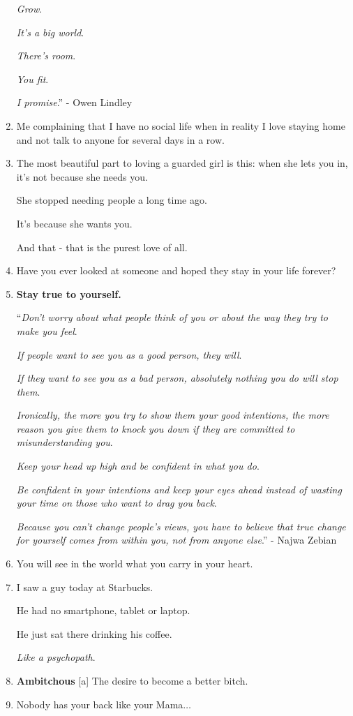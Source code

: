 \documentclass{article}
\begin{document}
\begin{enumerate}
	\textit{Grow}.
	
	\textit{It's a big world}.
	
	\textit{There's room}.
	
	\textit{You fit}.
	
	\textit{I promise}.'' - Owen Lindley
	\item Me complaining that I have no social life when in reality I love staying home and not talk to anyone for several days in a row.
	\item The most beautiful part to loving a guarded girl is this: when she lets you in, it's not because she needs you.
	
	She stopped needing people a long time ago.
	
	It's because she wants you.
	
	And that - that is the purest love of all.
	\item Have you ever looked at someone and hoped they stay in your life forever?
	\item \textbf{Stay true to yourself.}
	
	``\textit{Don't worry about what people think of you or about the way they try to make you feel}.
	
	\textit{If people want to see you as a good person, they will}.
	
	\textit{If they want to see you as a bad person, absolutely nothing you do will stop them}.
	
	\textit{Ironically, the more you try to show them your good intentions, the more reason you give them to knock you down if they are committed to misunderstanding you}.
	
	\textit{Keep your head up high and be confident in what you do}.
	
	\textit{Be confident in your intentions and keep your eyes ahead instead of wasting your time on those who want to drag you back}.
	
	\textit{Because you can't change people's views, you have to believe that true change for yourself comes from within you, not from anyone else}.'' - Najwa Zebian
	\item You will see in the world what you carry in your heart.
	\item I saw a guy today at Starbucks.
	
	He had no smartphone, tablet or laptop.
	
	He just sat there drinking his coffee.
	
	\textit{Like a psychopath}.
	\item \textbf{Ambitchous} [a] The desire to become a better bitch.
	\item Nobody has your back like your Mama$\ldots$
	

\end{enumerate}
\end{document}
